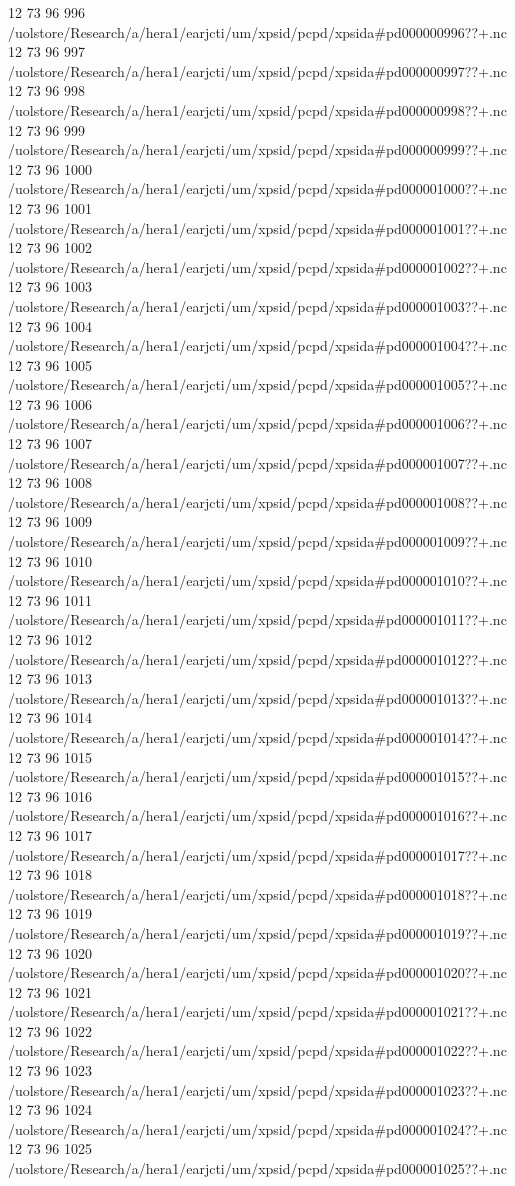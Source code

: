12 73 96
996
/uolstore/Research/a/hera1/earjcti/um/xpsid/pcpd/xpsida#pd000000996??+.nc
12 73 96
997
/uolstore/Research/a/hera1/earjcti/um/xpsid/pcpd/xpsida#pd000000997??+.nc
12 73 96
998
/uolstore/Research/a/hera1/earjcti/um/xpsid/pcpd/xpsida#pd000000998??+.nc
12 73 96
999
/uolstore/Research/a/hera1/earjcti/um/xpsid/pcpd/xpsida#pd000000999??+.nc
12 73 96
1000
/uolstore/Research/a/hera1/earjcti/um/xpsid/pcpd/xpsida#pd000001000??+.nc
12 73 96
1001
/uolstore/Research/a/hera1/earjcti/um/xpsid/pcpd/xpsida#pd000001001??+.nc
12 73 96
1002
/uolstore/Research/a/hera1/earjcti/um/xpsid/pcpd/xpsida#pd000001002??+.nc
12 73 96
1003
/uolstore/Research/a/hera1/earjcti/um/xpsid/pcpd/xpsida#pd000001003??+.nc
12 73 96
1004
/uolstore/Research/a/hera1/earjcti/um/xpsid/pcpd/xpsida#pd000001004??+.nc
12 73 96
1005
/uolstore/Research/a/hera1/earjcti/um/xpsid/pcpd/xpsida#pd000001005??+.nc
12 73 96
1006
/uolstore/Research/a/hera1/earjcti/um/xpsid/pcpd/xpsida#pd000001006??+.nc
12 73 96
1007
/uolstore/Research/a/hera1/earjcti/um/xpsid/pcpd/xpsida#pd000001007??+.nc
12 73 96
1008
/uolstore/Research/a/hera1/earjcti/um/xpsid/pcpd/xpsida#pd000001008??+.nc
12 73 96
1009
/uolstore/Research/a/hera1/earjcti/um/xpsid/pcpd/xpsida#pd000001009??+.nc
12 73 96
1010
/uolstore/Research/a/hera1/earjcti/um/xpsid/pcpd/xpsida#pd000001010??+.nc
12 73 96
1011
/uolstore/Research/a/hera1/earjcti/um/xpsid/pcpd/xpsida#pd000001011??+.nc
12 73 96
1012
/uolstore/Research/a/hera1/earjcti/um/xpsid/pcpd/xpsida#pd000001012??+.nc
12 73 96
1013
/uolstore/Research/a/hera1/earjcti/um/xpsid/pcpd/xpsida#pd000001013??+.nc
12 73 96
1014
/uolstore/Research/a/hera1/earjcti/um/xpsid/pcpd/xpsida#pd000001014??+.nc
12 73 96
1015
/uolstore/Research/a/hera1/earjcti/um/xpsid/pcpd/xpsida#pd000001015??+.nc
12 73 96
1016
/uolstore/Research/a/hera1/earjcti/um/xpsid/pcpd/xpsida#pd000001016??+.nc
12 73 96
1017
/uolstore/Research/a/hera1/earjcti/um/xpsid/pcpd/xpsida#pd000001017??+.nc
12 73 96
1018
/uolstore/Research/a/hera1/earjcti/um/xpsid/pcpd/xpsida#pd000001018??+.nc
12 73 96
1019
/uolstore/Research/a/hera1/earjcti/um/xpsid/pcpd/xpsida#pd000001019??+.nc
12 73 96
1020
/uolstore/Research/a/hera1/earjcti/um/xpsid/pcpd/xpsida#pd000001020??+.nc
12 73 96
1021
/uolstore/Research/a/hera1/earjcti/um/xpsid/pcpd/xpsida#pd000001021??+.nc
12 73 96
1022
/uolstore/Research/a/hera1/earjcti/um/xpsid/pcpd/xpsida#pd000001022??+.nc
12 73 96
1023
/uolstore/Research/a/hera1/earjcti/um/xpsid/pcpd/xpsida#pd000001023??+.nc
12 73 96
1024
/uolstore/Research/a/hera1/earjcti/um/xpsid/pcpd/xpsida#pd000001024??+.nc
12 73 96
1025
/uolstore/Research/a/hera1/earjcti/um/xpsid/pcpd/xpsida#pd000001025??+.nc
